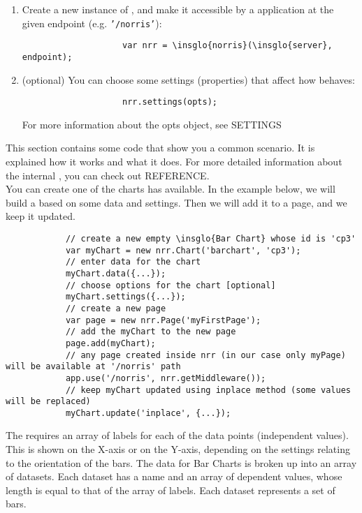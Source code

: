 \begin{itemize}
\begin{enumerate}
\begin{lstlisting}
				\end{lstlisting}
				\item Create a new instance of , and make it accessible by a  application at the given endpoint (e.g. \texttt{'/norris'}):
				\begin{lstlisting}
					var nrr = \insglo{norris}(\insglo{server}, endpoint);
				\end{lstlisting}
				\item (optional) You can choose some settings (properties) that affect how  behaves:
				\begin{lstlisting}
					nrr.settings(opts);
				\end{lstlisting}
				For more information about the opts object, see  SETTINGS
			\end{enumerate}
		\end{itemize}
		This section contains some code that show you a common scenario. It is explained how it works and what it does. For more detailed information about the internal , you can check out  REFERENCE.\\
		You can create one of the charts  has available. In the example below, we will build a  based on some data and settings. Then we will add it to a page, and we keep it updated.
		\begin{lstlisting}
			// create a new empty \insglo{Bar Chart} whose id is 'cp3'
			var myChart = new nrr.Chart('barchart', 'cp3');
			// enter data for the chart
			myChart.data({...});
			// choose options for the chart [optional]
			myChart.settings({...});
			// create a new page
			var page = new nrr.Page('myFirstPage');
			// add the myChart to the new page
			page.add(myChart);
			// any page created inside nrr (in our case only myPage) will be available at '/norris' path
			app.use('/norris', nrr.getMiddleware());
			// keep myChart updated using inplace method (some values will be replaced)
			myChart.update('inplace', {...});
		\end{lstlisting}
			The  requires an array of labels for each of the data points (independent values). This is shown on the X-axis or on the Y-axis, depending on the settings relating to the orientation of the bars. The data for Bar Charts is broken up into an array of datasets. Each dataset has a name and an array of dependent values, whose length is equal to that of the array of labels. Each dataset represents a set of bars.\\
